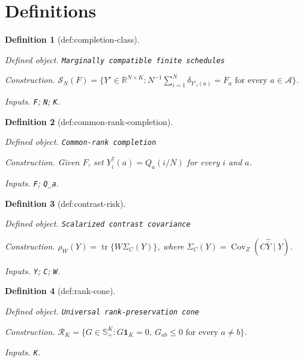 \documentclass{article}
\newtheorem{definition}{Definition}
\begin{document}
\section{Definitions}

\begin{definition}[def:completion-class]\label{def:completion-class}
\par\smallskip\noindent\emph{Defined object.} \texttt{Marginally compatible finite schedules}
\par\smallskip\noindent\emph{Construction.} \(\mathcal S_N(F)=\{Y'\in\mathbb R^{N\times K}:N^{-1}\sum_{i=1}^N\delta_{Y'_i(a)}=F_a\text{ for every }a\in\mathcal A\}\).
\par\smallskip\noindent\emph{Inputs.} \texttt{F}; \texttt{N}; \texttt{K}.
\end{definition}

\begin{definition}[def:common-rank-completion]\label{def:common-rank-completion}
\par\smallskip\noindent\emph{Defined object.} \texttt{Common-\allowbreak{}rank completion}
\par\smallskip\noindent\emph{Construction.} Given \(F\), set \(Y_i^{\uparrow}(a)=Q_a(i/N)\) for every \(i\) and \(a\).
\par\smallskip\noindent\emph{Inputs.} \texttt{F}; \texttt{Q\_\allowbreak{}a}.
\end{definition}

\begin{definition}[def:contrast-risk]\label{def:contrast-risk}
\par\smallskip\noindent\emph{Defined object.} \texttt{Scalarized contrast covariance}
\par\smallskip\noindent\emph{Construction.} \(\rho_W(Y)=\operatorname{tr}\{W\Sigma_C(Y)\}\), where \(\Sigma_C(Y)=\operatorname{Cov}_Z(C\widehat{\bar Y}\mid Y)\).
\par\smallskip\noindent\emph{Inputs.} \texttt{Y}; \texttt{C}; \texttt{W}.
\end{definition}

\begin{definition}[def:rank-cone]\label{def:rank-cone}
\par\smallskip\noindent\emph{Defined object.} \texttt{Universal rank-\allowbreak{}preservation cone}
\par\smallskip\noindent\emph{Construction.} \(\mathcal R_K=\{G\in\mathbb S_+^K:G\mathbf 1_K=0,\ G_{ab}\leq0\text{ for every }a\neq b\}\).
\par\smallskip\noindent\emph{Inputs.} \texttt{K}.
\end{definition}
\end{document}
